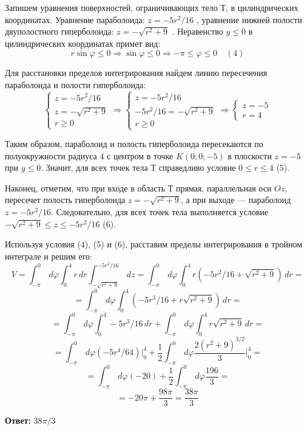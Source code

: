 \documentclass[12pt]{article}
\begin{document}
\begin{enumerate}[wide, labelwidth=!, labelindent=0pt]
		Запишем уравнения поверхностей, ограничивающих тело $Т$, в цилиндрических координатах. Уравнение параболоида: $z = -5r^2/16 $ , уравнение нижней полости двуполостного гиперболоида: $z=-\sqrt{r^2 + 9}$ . Неравенство $y\leq 0$ в цилиндрических координатах примет вид: 
		$$r\sin\varphi \leq 0 \Rightarrow \sin \varphi \leq 0 \Rightarrow - \pi \leq \varphi \leq 0\quad(4)$$ 
		
		Для расстановки пределов интегрирования найдем линию пересечения параболоида и полости гиперболоида:
		\begin{equation*}	 
			\begin{cases}
				z = -5r^2/16\\
				z=-\sqrt{r^2 + 9}\\
				r \geq 0
			\end{cases}
			\Rightarrow
			\begin{cases}
				z = -5r^2/16\\
				-5r^2/16=-\sqrt{r^2 + 9}\\
				r \geq 0
			\end{cases}
			\Rightarrow
			\begin{cases}
				z = -5\\
				r=4
			\end{cases}
		\end{equation*}
		
		Таким образом, параболоид и полость гиперболоида пересекаются по полуокружности радиуса $4$ с центром в точке $K(0;0;-5)$ в плоскости $z = -5$ при $y \leq 0$. Значит, для всех точек тела $Т$ справедливо условие $0 \leq r \leq 4$	(5). 
		
		Наконец, отметим, что при входе в область $Т$ прямая, параллельная оси $Oz$, пересечет полость гиперболоида $ z=-\sqrt{r^2 + 9} $, а при выходе --- параболоид $ z = -5r^2/16 $. Следовательно, для всех точек тела выполняется условие $ -\sqrt{r^2 + 9} \leq z \leq  -5r^2/16 $ (6). 
		
		Используя условия	(4), (5) и (6), расставим пределы интегрирования в тройном интеграле и решим его:			
		$$ V= \int_{- \pi}^{0} \,d \varphi \int_{0}^{4} r \,d r \int_{-\sqrt{r^2 + 9}}^{-5r^2/16} \,d z = \int_{- \pi}^{0} \,d \varphi \int_{0}^{4} r(-5r^2/16 +\sqrt{r^2 + 9}) \,d r  = $$
		$$ = \int_{- \pi}^{0} \,d \varphi \int_{0}^{4} (-5r^3/16 +r\sqrt{r^2 + 9}) \,d r = $$
		$$ = \int_{- \pi}^{0} \,d \varphi \int_{0}^{4} -5r^3/16 \,d r + \int_{- \pi}^{0} \,d \varphi \int_{0}^{4}r\sqrt{r^2 + 9} \,d r = $$
		$$ = \int_{- \pi}^{0} \,d \varphi  (-5r^4/64) \Big|_0^{4}  + \frac{1}{2} \int_{- \pi}^{0} \,d \varphi \frac{2(r^2 + 9)^{3/2}}{3} \Big|_0^{4} =$$
		$$ = \int_{- \pi}^{0} \,d \varphi(-20)  + \frac{1}{2} \int_{- \pi}^{0} \,d \varphi \frac{196}{3} = $$
		$$ = -20\pi + \frac{98\pi}{3} = \frac{38\pi}{3} $$
		
		\hspace{290pt}\textbf{Ответ:} $38\pi/3$	
	\end{enumerate}
	\newpage 
	
\end{document}

